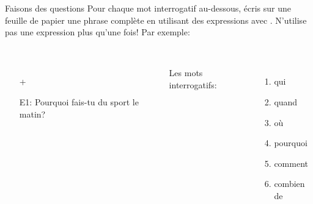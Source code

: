 \begin{frame}{Faisons des questions}
  Pour chaque mot interrogatif au-dessous, écris sur une feuille de papier une phrase complète en utilisant des expressions avec .
  N'utilise pas une expression plus qu'une fois! Par exemple:\\
   \\
  \vspace{0.25cm}
  \begin{columns}
      \begin{itemize}
        \item[]  + 
        \item[E1:] Pourquoi fais-tu du sport le matin?
      \end{itemize}
      Les mots interrogatifs:
      \begin{enumerate}
        \item qui
        \item quand
        \item où
        \item pourquoi
        \item comment
        \item combien de
      \end{enumerate}
  \end{columns}
\end{frame}